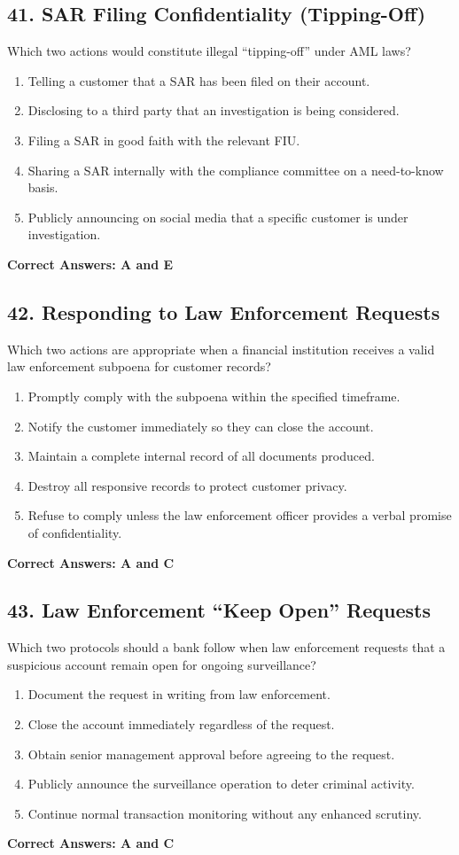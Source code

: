 \documentclass[11pt,a4paper]{article}
\begin{document}
	\subsection{41. SAR Filing Confidentiality (Tipping-Off)}
	Which two actions would constitute illegal ``tipping-off'' under AML laws?
	\begin{enumerate}[label=\Alph*.]
		\item Telling a customer that a SAR has been filed on their account.
		\item Disclosing to a third party that an investigation is being considered.
		\item Filing a SAR in good faith with the relevant FIU.
		\item Sharing a SAR internally with the compliance committee on a need-to-know basis.
		\item Publicly announcing on social media that a specific customer is under investigation.
	\end{enumerate}
	\textbf{Correct Answers: A and E}
	
	\subsection{42. Responding to Law Enforcement Requests}
	Which two actions are appropriate when a financial institution receives a valid law enforcement subpoena for customer records?
	\begin{enumerate}[label=\Alph*.]
		\item Promptly comply with the subpoena within the specified timeframe.
		\item Notify the customer immediately so they can close the account.
		\item Maintain a complete internal record of all documents produced.
		\item Destroy all responsive records to protect customer privacy.
		\item Refuse to comply unless the law enforcement officer provides a verbal promise of confidentiality.
	\end{enumerate}
	\textbf{Correct Answers: A and C}
	
	\subsection{43. Law Enforcement ``Keep Open'' Requests}
	Which two protocols should a bank follow when law enforcement requests that a suspicious account remain open for ongoing surveillance?
	\begin{enumerate}[label=\Alph*.]
		\item Document the request in writing from law enforcement.
		\item Close the account immediately regardless of the request.
		\item Obtain senior management approval before agreeing to the request.
		\item Publicly announce the surveillance operation to deter criminal activity.
		\item Continue normal transaction monitoring without any enhanced scrutiny.
	\end{enumerate}
	\textbf{Correct Answers: A and C}
	
\end{document}
